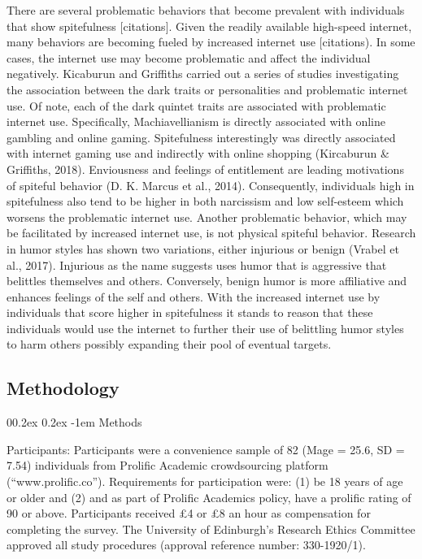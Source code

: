 \documentclass[
  english,
  donotrepeattitle,doc, 12pt, a4paper,floatsintext]{apa7}
\makeatletter
\let\oldparagraph\paragraph
\renewcommand{\paragraph}[1]{\oldparagraph{#1}\mbox{}}
\renewcommand{\paragraph}{\@startsection{paragraph}{4}{\parindent}%
  {0\baselineskip \@plus 0.2ex \@minus 0.2ex}%
  {-1em}%
  {\normalfont\normalsize\bfseries\itshape\typesectitle}}
\makeatother
\begin{document}
There are several problematic behaviors that become prevalent with individuals that show spitefulness {[}citations{]}. Given the readily available high-speed internet, many behaviors are becoming fueled by increased internet use {[}citations). In some cases, the internet use may become problematic and affect the individual negatively. Kicaburun and Griffiths carried out a series of studies investigating the association between the dark traits or personalities and problematic internet use. Of note, each of the dark quintet traits are associated with problematic internet use. Specifically, Machiavellianism is directly associated with online gambling and online gaming. Spitefulness interestingly was directly associated with internet gaming use and indirectly with online shopping (Kircaburun \& Griffiths, 2018). Enviousness and feelings of entitlement are leading motivations of spiteful behavior (D. K. Marcus et al., 2014). Consequently, individuals high in spitefulness also tend to be higher in both narcissism and low self-esteem which worsens the problematic internet use. Another problematic behavior, which may be facilitated by increased internet use, is not physical spiteful behavior. Research in humor styles has shown two variations, either injurious or benign (Vrabel et al., 2017). Injurious as the name suggests uses humor that is aggressive that belittles themselves and others. Conversely, benign humor is more affiliative and enhances feelings of the self and others. With the increased internet use by individuals that score higher in spitefulness it stands to reason that these individuals would use the internet to further their use of belittling humor styles to harm others possibly expanding their pool of eventual targets.

\hypertarget{methodology}{%
\subsection{Methodology}\label{methodology}}

\hypertarget{methods}{%
\paragraph{Methods}\label{methods}}

Participants: Participants were a convenience sample of 82 (Mage = 25.6, SD = 7.54) individuals from Prolific Academic crowdsourcing platform (``www.prolific.co''). Requirements for participation were: (1) be 18 years of age or older and (2) and as part of Prolific Academics policy, have a prolific rating of 90 or above. Participants received £4 or £8 an hour as compensation for completing the survey. The University of Edinburgh's Research Ethics Committee approved all study procedures (approval reference number: 330-1920/1).
\end{document}
